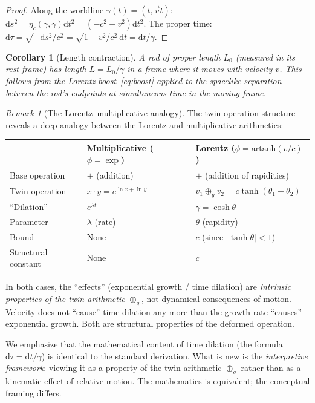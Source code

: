 \documentclass[12pt]{article}
\theoremstyle{plain}
\newtheorem{corollary}[theorem]{Corollary}
\theoremstyle{definition}
\theoremstyle{remark}
\newtheorem{remark}[theorem]{Remark}
\newcommand{\dd}{\mathrm{d}}
\begin{document}
\begin{proof}
Along the worldline $\gamma(t) = (t, \vec{v}t)$: $\dd s^2 = \eta_c(\dot\gamma, \dot\gamma)\dd t^2 = (-c^2 + v^2)\dd t^2$. The proper time: $\dd\tau = \sqrt{-\dd s^2/c^2} = \sqrt{1 - v^2/c^2}\,\dd t = \dd t/\gamma$.
\end{proof}

\begin{corollary}[Length contraction]
A rod of proper length $L_0$ (measured in its rest frame) has length $L = L_0/\gamma$ in a frame where it moves with velocity $v$. This follows from the Lorentz boost~\eqref{eq:boost} applied to the spacelike separation between the rod's endpoints at simultaneous time in the moving frame.
\end{corollary}

\begin{remark}[The Lorentz--multiplicative analogy]\label{rmk:lorentz-mult}
The twin operation structure reveals a deep analogy between the Lorentz and multiplicative arithmetics:

\begin{center}\small
\begin{tabular}{lll}\toprule
& \textbf{Multiplicative} ($\phi = \exp$) & \textbf{Lorentz} ($\phi = \mathrm{artanh}(v/c)$) \\\midrule
Base operation & $+$ (addition) & $+$ (addition of rapidities) \\
Twin operation & $x \cdot y = e^{\ln x + \ln y}$ & $v_1\oplus_g v_2 = c\tanh(\theta_1+\theta_2)$ \\
``Dilation'' & $e^{\lambda t}$ & $\gamma = \cosh\theta$ \\
Parameter & $\lambda$ (rate) & $\theta$ (rapidity) \\
Bound & None & $c$ (since $|\tanh\theta| < 1$) \\
Structural constant & None & $c$ \\
\bottomrule
\end{tabular}
\end{center}

In both cases, the ``effects'' (exponential growth / time dilation) are \emph{intrinsic properties of the twin arithmetic} $\oplus_g$, not dynamical consequences of motion. Velocity does not ``cause'' time dilation any more than the growth rate ``causes'' exponential growth. Both are structural properties of the deformed operation.

We emphasize that the mathematical content of time dilation (the formula $\dd\tau = \dd t/\gamma$) is identical to the standard derivation. What is new is the \emph{interpretive framework}: viewing it as a property of the twin arithmetic $\oplus_g$ rather than as a kinematic effect of relative motion. The mathematics is equivalent; the conceptual framing differs.
\end{remark}
\end{document}
